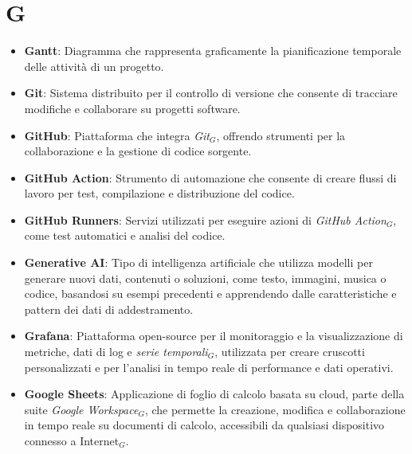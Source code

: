 \section{G}
\begin{itemize}
    \item \textbf{Gantt}: Diagramma che rappresenta graficamente la pianificazione temporale delle attività di un progetto.
    \item \textbf{Git}: Sistema distribuito per il controllo di versione che consente di tracciare modifiche e collaborare su progetti software.
    \item \textbf{GitHub}: Piattaforma che integra \textit{Git}$_G$, offrendo strumenti per la collaborazione e la gestione di codice sorgente.
    \item \textbf{GitHub Action}: Strumento di automazione che consente di creare flussi di lavoro per test, compilazione e distribuzione del codice.
    \item \textbf{GitHub Runners}: Servizi utilizzati per eseguire azioni di \textit{GitHub Action}$_G$, come test automatici e analisi del codice.
    \item \textbf{Generative AI}: Tipo di intelligenza artificiale che utilizza modelli per generare nuovi dati, contenuti o soluzioni, come testo, immagini, musica o codice, basandosi su esempi precedenti e apprendendo dalle caratteristiche e pattern dei dati di addestramento.
    \item \textbf{Grafana}: Piattaforma open-source per il monitoraggio e la visualizzazione di metriche, dati di log e \textit{serie temporali$_G$}, utilizzata per creare cruscotti personalizzati e per l'analisi in tempo reale di performance e dati operativi.
    \item \textbf{Google Sheets}: Applicazione di foglio di calcolo basata su cloud, parte della suite \textit{Google Workspace}$_G$, che permette la creazione, modifica e collaborazione in tempo reale su documenti di calcolo, accessibili da qualsiasi dispositivo connesso a Internet$_G$.


\end{itemize}
